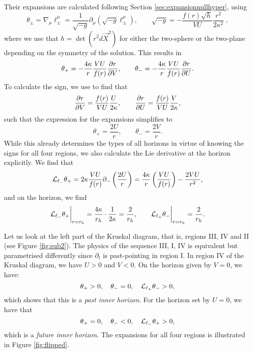 Their expansions are calculated following Section \ref{sec:expansionnullhyper}, using 
\begin{equation*}
    \theta_\pm = \nabla_\mu \ell^{\mu}_\pm = \frac{1}{\sqrt{-g}} \partial_\mu \left(\sqrt{-g} \ell^\mu_\pm \right), \qquad \sqrt{-g} = -  \frac{f(r) \sqrt{h}}{V U} \frac{r^2}{2 \kappa^2}\;,
\end{equation*}
where we use that $h = \det \left( r^2 d\vec{X}^2 \right)$ for either the two-sphere or the two-plane depending on the symmetry of the solution. This results in
\begin{equation*}
    \theta_+ = - \frac{4 \kappa}{r} \frac{V U}{f(r)} \frac{\partial r}{\partial V}, \qquad     \theta_- = - \frac{4 \kappa}{r} \frac{V U}{f(r)} \frac{\partial r}{\partial U}.
\end{equation*}
To calculate the sign, we use  to find that
\begin{equation*}
    \frac{\partial r}{\partial V} = \frac{f(r)}{V U} \frac{U}{2 \kappa}, \qquad \frac{\partial r}{\partial U} = \frac{f(r)}{V U} \frac{V}{2 \kappa},
\end{equation*}
such that the expression for the expansions simplifies to
\begin{equation*}
    \theta_+ = \frac{2 U}{r}, \qquad \theta_- = \frac{2 V}{r}.
\end{equation*}
While this already determines the types of all horizons in virtue of knowing the signs for all four regions, we also calculate the Lie derivative at the horizon explicitly. We find that
\begin{equation*}
    {\cal L}_{\ell_-} \theta_+ = 2 \kappa \frac{ V U }{f(r)}  \partial_- \left( \frac{2 U}{r} \right) = \frac{4 \kappa}{r} \left( \frac{V U}{f(r)} \right) - \frac{2 V U}{r^2},
\end{equation*}
and on the horizon, we find
\begin{equation*}
    {\cal L}_{\ell_-} \theta_+ \bigg|_{r = r_h} = \frac{4 \kappa}{r_h} \cdot \frac{1}{2\kappa} = \frac{2}{r_h}, \qquad     {\cal L}_{\ell_+} \theta_- \bigg|_{r = r_h} = \frac{2}{r_h}.
\end{equation*}

Let us look at the left part of the Kruskal diagram, that is, regions III, IV and II (see Figure \ref{fig:sub2}). The physics of the sequence III, I, IV is equivalent but parametrised differently since $\partial_t$ is past-pointing in region I. In region IV of the Kruskal diagram, we have $U > 0$ and $V < 0$. On the horizon given by $V = 0$, we have:
\begin{equation*}
    \theta_+ > 0, \quad \theta_- = 0, \quad {\cal L}_{\ell_+} \theta_- > 0,
\end{equation*}
which shows that this is a \emph{past inner horizon}. For the horizon set by $U = 0$, we have that 
\begin{equation*}
    \theta_+ = 0, \quad \theta_- < 0, \quad {\cal L}_{\ell_-} \theta_+ > 0,
\end{equation*}
which is a \emph{future inner horizon}. The expansions for all four regions is illustrated in Figure \ref{fig:flipped}. 

